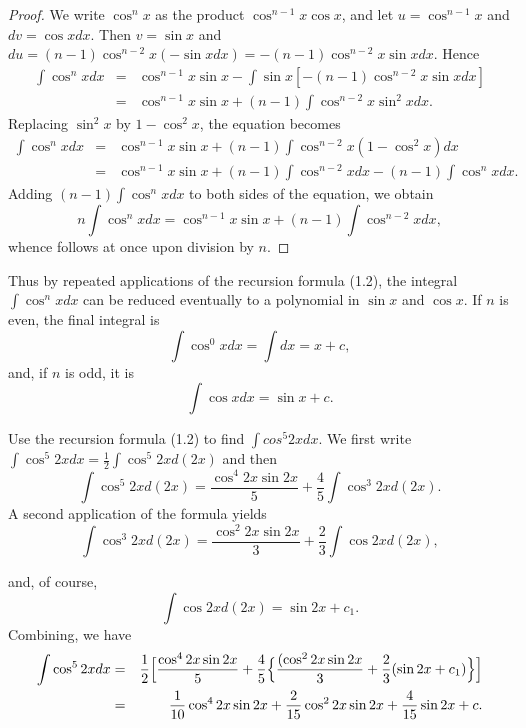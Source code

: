 \begin{proof}
We write $\cos^{n} x$ as the product $\cos^{n - 1} x \cos x$, and let $u = \cos^{n - 1} x$ 
and $dv = \cos x dx$.  Then $v = \sin x$ and $du = (n - 1) \cos^{n-2} x (-\sin x dx) 
= - (n - 1) \cos^{n-2} x \sin x dx$. Hence
\begin{eqnarray*}
\int \cos^{n} x dx &=& \cos^{n-1} x \sin x - \int \sin x[ -(n - 1) \cos^{n-2}x \sin x dx]\\
                           &=& \cos^{n-1} x \sin x + (n - 1) \int \cos^{n-2}x \sin^{2}x dx.
\end{eqnarray*}
Replacing $\sin^{2}x$ by $1 - \cos^{2}x$, the equation becomes 
\begin{eqnarray*}
\int \cos^{n}x dx 
&=& \cos^{n-1} x \sin x + (n -1)\int \cos^{n-2} x (1 - \cos^{2}x) dx \\
&=& \cos^{n - 1} x \sin x + (n -1) \int \cos^{n - 2} x dx - (n -1) \int \cos^{n} x dx .
\end{eqnarray*}
Adding $(n-1) \int \cos^{n} x dx$ to both sides of the equation, we obtain 
$$
n \int \cos^{n} x dx = \cos^{n - 1} x \sin x + (n - 1) \int \cos^{n -2} x dx,
$$
whence  follows at once upon division by $n$.
\end{proof}

Thus by repeated applications of the recursion formula (1.2), the integral $\int \cos^{n} x dx$ can be reduced eventually to a polynomial in $\sin x$ and $\cos x$. If $n$ is even, the final integral is
$$
\int \cos^{0} x dx = \int dx = x + c, 
$$
\noindent and, if $n$ is odd, it is
$$
\int \cos x dx = \sin x + c.
$$

\begin{example}
Use the recursion formula (1.2) to find $\int cos^{5}2x dx$. We first write $\int \cos^{5}2x dx = \frac{1}{2} \int \cos^{5} 2x d(2x)$ and then
$$
\int \cos^{5}2x d(2x) = \frac{\cos^{4} 2x \sin 2x}{5} + \frac{4}{5} \int  \cos^{3}2x d(2x).  
$$
\noindent A second application of the formula yields
$$
\int \cos^{3} 2x d(2x) = \frac{\cos^{2} 2x \sin 2x}{3} + \frac{2}{3} \int \cos 2x d(2x), 
$$

\noindent and, of course,
$$
\int \cos 2x d(2x) = \sin 2x + c_1.
$$
\noindent Combining, we have 
\begin{eqnarray*}
\int \cos^{5} 2x dx &=& \frac{1}{2} \Bigl[ \frac{\cos^{4} 2x\sin 2x}{5} 
+ \frac{4}{5} \Big\{ \frac{ (\cos^{2} 2x \sin 2x}{3} + \frac{2}{3} ( \sin 2x + c_1) \Big\} \Bigr] \\
&=& \frac{1}{10} \cos^{4} 2x \sin 2x + \frac{2}{15} \cos^{2} 2x \sin 2x + \frac{4}{15} \sin 2x + c.
\end{eqnarray*}
\end{example}
